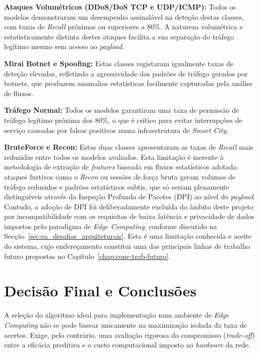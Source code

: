 \textbf{Ataques Volumétricos (DDoS/DoS TCP e UDP/ICMP):} Todos os modelos
demonstraram um desempenho assinalável na deteção destas classes, com taxas
de \textit{Recall} próximas ou superiores a 80\%. A natureza volumétrica
e estatisticamente distinta destes ataques facilita a sua separação do
tráfego legítimo mesmo sem acesso ao \textit{payload}.

\textbf{Mirai Botnet e Spoofing:} Estas classes registaram igualmente
taxas de deteção elevadas, refletindo a agressividade dos padrões de
tráfego gerados por botnets, que produzem anomalias estatísticas facilmente
capturadas pela análise de fluxos.

\textbf{Tráfego Normal:} Todos os modelos garantiram uma taxa de permissão
de tráfego legítimo próxima dos 80\%, o que é crítico para evitar
interrupções de serviço causadas por falsos positivos numa infraestrutura
de \textit{Smart City}.

\textbf{BruteForce e Recon:} Estas duas classes apresentaram as taxas de
\textit{Recall} mais reduzidas entre todos os modelos avaliados. Esta
limitação é inerente à metodologia de extração de \textit{features}
baseada em fluxos estatísticos adotada: ataques furtivos como o
\textit{Recon} ou sessões de força bruta geram volumes de tráfego
reduzidos e padrões estatísticos subtis, que só seriam plenamente
distinguíveis através da Inspeção Profunda de Pacotes (DPI) ao nível
do \textit{payload}. Contudo, a adoção de DPI foi deliberadamente
excluída do âmbito deste projeto por incompatibilidade com os requisitos
de baixa latência e privacidade de dados impostos pelo paradigma de
\textit{Edge Computing}, conforme discutido na Secção~\ref{sec:ea_desafios_arquiteturais}.
Esta é uma limitação conhecida e aceite do sistema, cujo endereçamento
constitui uma das principais linhas de trabalho futuro propostas no
Capítulo~\ref{chap:conc-trab-futuro}.



\section{Decisão Final e Conclusões}
\label{chap4:sec:concs}

A seleção do algoritmo ideal para implementação num ambiente de \textit{Edge Computing} não se pode basear unicamente na maximização isolada da taxa de acertos. Exige, pelo contrário, uma avaliação rigorosa do compromisso (\textit{trade-off}) entre a eficácia preditiva e o custo computacional imposto ao \textit{hardware} da rede.

